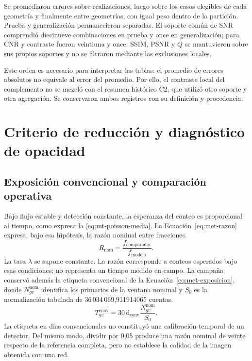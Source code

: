 Se promediaron errores sobre realizaciones, luego sobre los casos elegibles de cada geometría y finalmente entre geometrías, con igual peso dentro de la partición. Prueba y generalización permanecieron separadas. El soporte común de SNR comprendió diecinueve combinaciones en prueba y once en generalización; para CNR y contraste fueron veintiuna y once. SSIM, PSNR y $Q$ se mantuvieron sobre sus propios soportes y no se filtraron mediante las exclusiones locales.

Este orden es necesario para interpretar las tablas: el promedio de errores absolutos no equivale al error del promedio. Por ello, el contraste local del complemento no se mezcló con el resumen histórico C2, que utilizó otro soporte y otra agregación. Se conservaron ambos registros con su definición y procedencia.

\section{Criterio de reducción y diagnóstico de opacidad}\label{sec:met-factor}
\subsection{Exposición convencional y comparación operativa}
Bajo flujo estable y detección constante, la esperanza del conteo es proporcional al tiempo, como expresa la \cref{eq:mt-poisson-media}. La Ecuación~\eqref{eq:met-razon} expresa, bajo esa hipótesis, la razón nominal entre fracciones.
\begin{equation}R_{\mathrm{nom}}=\frac{f_{\mathrm{comparador}}}{f_{\mathrm{modelo}}}.\label{eq:met-razon}\end{equation}
La tasa $\lambda$ se supone constante. La razón corresponde a conteos esperados bajo esas condiciones; no representa un tiempo medido en campo. La campaña conservó además la etiqueta convencional de la Ecuación~\eqref{eq:met-exposicion}, donde $N^{\mathrm{nom}}_{gv}$ identifica los primarios de la ventana nominal y $S_0$ es la normalización tabulada de 36\,034\,069,911914065 cuentas.
\begin{equation}T^{\mathrm{conv}}_{gv}=30\,\mathrm d_{\mathrm{conv}}\frac{N^{\mathrm{nom}}_{gv}}{S_0}.\label{eq:met-exposicion}\end{equation}
La etiqueta en días convencionales no constituyó una calibración temporal de un detector. Del mismo modo, dividir por 0,05 produce una razón nominal de veinte respecto de la referencia completa, pero no establece la calidad de la imagen obtenida con una red.

